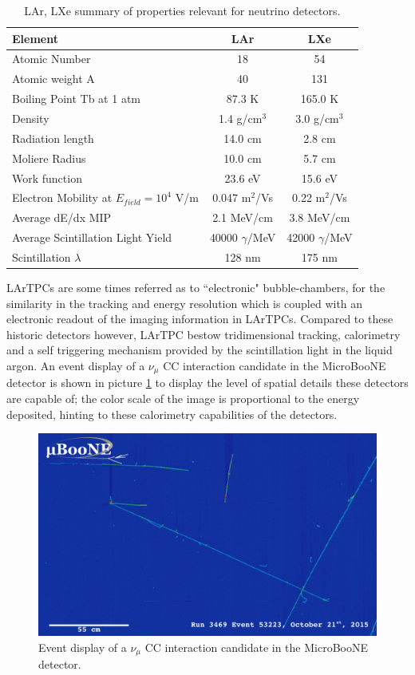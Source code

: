 \begin{table}[]
\centering
\begin{tabular}{|l|c|c|}\hline
Element & LAr & LXe \\
\hline
\hline
Atomic Number &  18 &54 \\
Atomic weight A & 40  & 131\\
Boiling Point Tb at 1 atm & 87.3 K & 165.0 K\\
Density  & 1.4 g/cm$^3$& 3.0 g/cm$^3$\\
Radiation length  & 14.0 cm& 2.8 cm \\
Moliere Radius  &10.0 cm& 5.7 cm\\
Work function  & 23.6 eV&15.6 eV\\
Electron Mobility at $E_{field} =10^4$ V/m &0.047 m$^2$/Vs& 0.22 m$^2$/Vs\\
Average dE/dx MIP  & 2.1 MeV/cm&3.8 MeV/cm\\
Average Scintillation Light Yield & 40000 $\gamma$/MeV&42000 $\gamma$/MeV\\
Scintillation $\lambda$  &128 nm&175 nm\\
\hline
\end{tabular}
\caption{LAr, LXe summary of properties relevant for neutrino detectors.}
\label{tab:properties}
\end{table}


LArTPCs are some times referred as to ``electronic" bubble-chambers, for the similarity in the tracking and energy resolution which is coupled with an electronic readout of the imaging information in LArTPCs. Compared to these historic detectors however, LArTPC bestow tridimensional tracking, calorimetry and a self triggering mechanism provided by the scintillation light in the liquid argon.  An event display of a $\nu_\mu$ CC interaction candidate in the MicroBooNE detector is shown in picture \ref{fig:NuEvd} to display the level of spatial details these detectors are capable of; the color scale of the image is proportional to the energy deposited, hinting to these calorimetry capabilities of the detectors.
\begin{figure}[hbpt]
\centering
\includegraphics[width=\textwidth]{Chapter-2/Images/run3469_subrun1064_event53223_col.pdf}
\caption{Event display of a $\nu_\mu$ CC interaction candidate in the MicroBooNE detector.}
\label{fig:NuEvd}
\end{figure}



